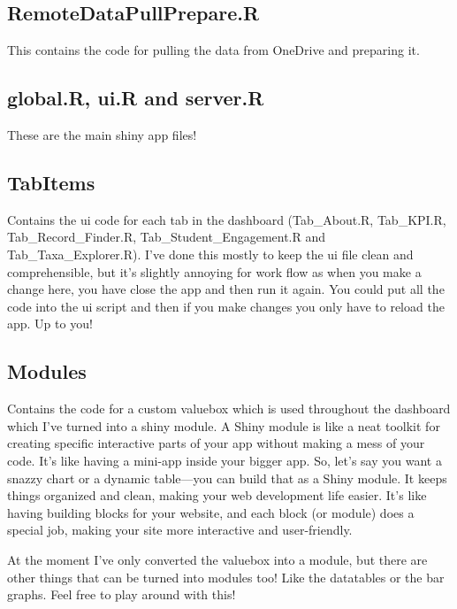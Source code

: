\documentclass[
]{book}
\begin{document}
\hypertarget{remotedatapullprepare.r}{%
\subsection{RemoteDataPullPrepare.R}\label{remotedatapullprepare.r}}

This contains the code for pulling the data from OneDrive and preparing it.

\hypertarget{global.r-ui.r-and-server.r}{%
\subsection{global.R, ui.R and server.R}\label{global.r-ui.r-and-server.r}}

These are the main shiny app files!

\hypertarget{tabitems}{%
\subsection{TabItems}\label{tabitems}}

Contains the ui code for each tab in the dashboard (Tab\_About.R, Tab\_KPI.R, Tab\_Record\_Finder.R, Tab\_Student\_Engagement.R and Tab\_Taxa\_Explorer.R). I've done this mostly to keep the ui file clean and comprehensible, but it's slightly annoying for work flow as when you make a change here, you have close the app and then run it again. You could put all the code into the ui script and then if you make changes you only have to reload the app. Up to you!

\hypertarget{modules}{%
\subsection{Modules}\label{modules}}

Contains the code for a custom valuebox which is used throughout the dashboard which I've turned into a shiny module. A Shiny module is like a neat toolkit for creating specific interactive parts of your app without making a mess of your code. It's like having a mini-app inside your bigger app. So, let's say you want a snazzy chart or a dynamic table---you can build that as a Shiny module. It keeps things organized and clean, making your web development life easier. It's like having building blocks for your website, and each block (or module) does a special job, making your site more interactive and user-friendly.

At the moment I've only converted the valuebox into a module, but there are other things that can be turned into modules too! Like the datatables or the bar graphs. Feel free to play around with this!
\end{document}
